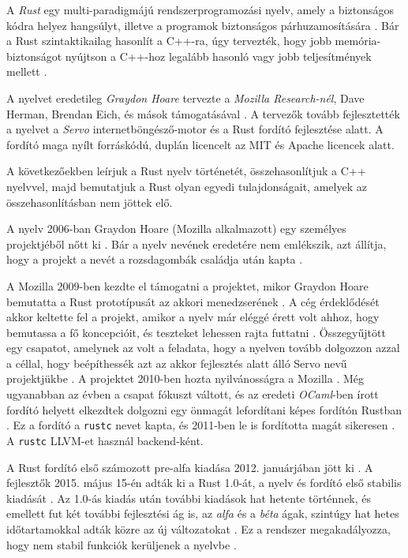 \label{sec:rust}

A \textit{Rust} egy multi-paradigmájú rendszerprogramozási nyelv,
amely a biztonságos kódra helyez hangsúlyt, illetve a programok biztonságos párhuzamosítására \cite{oldpage:main,mostlysafety,oldpage:faq:project}.
Bár a Rust szintaktikailag hasonlít a C++-ra, úgy tervezték, hogy jobb memória-biztonságot nyújtson a C++-hoz legalább hasonló vagy jobb teljesítmények mellett \cite{rustvscpp}.

A nyelvet eredetileg \textit{Graydon Hoare} tervezte a \textit{Mozilla Research-nél}, Dave Herman, Brendan Eich, és mások támogatásával \cite{rust:designedby}.
A tervezők tovább fejlesztették a nyelvet a \textit{Servo} internetböngésző-motor \cite{servo:ars, servo:mozilla} és a Rust fordító fejlesztése alatt.
A fordító maga nyílt forráskódú, duplán licencelt az MIT és Apache licencek alatt.

A következőekben leírjuk a Rust nyelv történetét, összehasonlítjuk a C++ nyelvvel,
majd bemutatjuk a Rust olyan egyedi tulajdonságait, amelyek az összehasonlításban nem jöttek elő.


A nyelv 2006-ban Graydon Hoare (Mozilla alkalmazott) egy személyes projektjéből nőtt ki \cite{oldpage:faq:project}.
Bár a nyelv nevének eredetére nem emlékszik, azt állítja, hogy a projekt a nevét a rozsdagombák családja után kapta \cite{rust:name}.

A Mozilla 2009-ben kezdte el támogatni a projektet, mikor Graydon Hoare bemutatta a Rust prototípusát az akkori menedzserének \cite{interview:graydon}.
A cég érdeklődését akkor keltette fel a projekt, amikor a nyelv már eléggé érett volt ahhoz, hogy bemutassa a fő koncepcióit, és teszteket lehessen rajta futtatni \cite{oldpage:faq:project}.
Összegyűjtött egy csapatot, amelynek az volt a feladata, hogy a nyelven tovább dolgozzon azzal a céllal, hogy beépíthessék azt az akkor fejlesztés alatt álló Servo nevű projektjükbe \cite{oldpage:faq:project, interview:graydon}.
A projektet 2010-ben hozta nyilvánosságra a Mozilla \cite{talk:servo}.
Még ugyanabban az évben a csapat fókuszt váltott, és az eredeti \textit{OCaml}-ben írott fordító helyett elkezdtek dolgozni egy önmagát lefordítani képes fordítón Rustban \cite{rust:compilerwork}.
Ez a fordító a \texttt{rustc} nevet kapta, és 2011-ben le is fordította magát sikeresen \cite{rust:successful_compile}. A \texttt{rustc} LLVM-et használ backend-ként.

A Rust fordító első számozott pre-alfa kiadása 2012. januárjában jött ki \cite{rust:first_release}.
A fejlesztők 2015. május 15-én adták ki a Rust 1.0-át, a nyelv és fordító első stabilis kiadását \cite{rust:1_0:blog, rust:version_history}.
Az 1.0-ás kiadás után további kiadások hat hetente történnek, és emellett fut két további fejlesztési ág is, az \textit{alfa} és a \textit{béta} ágak, szintúgy hat hetes időtartamokkal adták közre az új változatokat \cite{rust:release_cycle}.
Ez a rendszer megakadályozza, hogy nem stabil funkciók kerüljenek a nyelvbe \cite{rust:stability}.

